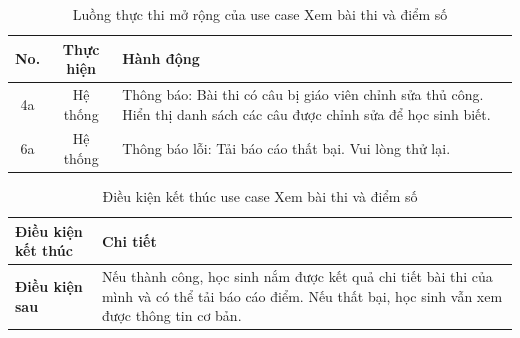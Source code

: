 ﻿\documentclass[../DoAn.tex]{subfiles}
\begin{document}
\begin{table}[H]
\centering
\begin{tabular}{|c|c|p{9cm}|}
\hline
\textbf{No.} & \textbf{Thực hiện} & \textbf{Hành động} \\ \hline
4a & Hệ thống & Thông báo: Bài thi có câu bị giáo viên chỉnh sửa thủ công. Hiển thị danh sách các câu được chỉnh sửa để học sinh biết. \\ \hline
6a & Hệ thống & Thông báo lỗi: Tải báo cáo thất bại. Vui lòng thử lại. \\ \hline
\end{tabular}
\caption{Luồng thực thi mở rộng của use case Xem bài thi và điểm số}
\label{table:appendix:B.4_ext}
\end{table}
\begin{table}[H]
\centering
\begin{tabular}{|p{4cm}|p{10cm}|}
\hline
\textbf{Điều kiện kết thúc} & \textbf{Chi tiết} \\ \hline
\textbf{Điều kiện sau} & Nếu thành công, học sinh nắm được kết quả chi tiết bài thi của mình và có thể tải báo cáo điểm. Nếu thất bại, học sinh vẫn xem được thông tin cơ bản. \\ \hline
\end{tabular}
\caption{Điều kiện kết thúc use case Xem bài thi và điểm số}
\label{table:appendix:B.4_post}
\end{table}
\end{document}
